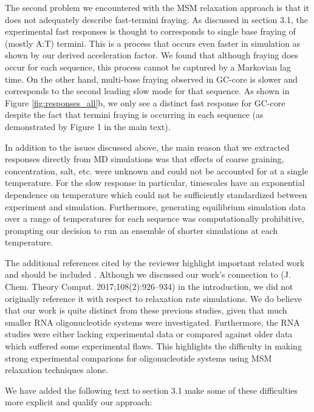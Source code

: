 \documentclass[11pt,a4paper]{letter} %
\begin{document}
The second problem we encountered with the MSM relaxation approach is that it does not adequately describe fast-termini fraying. As discussed in section 3.1, the experimental fast responses is thought to corresponds to single base fraying of (mostly A:T) termini. This is a process that occurs even faster in simulation as shown by our derived acceleration factor. We found that although fraying does occur for each sequence, this process cannot be captured by a Markovian lag time. On the other hand, multi-base fraying observed in GC-core is slower and corresponds to the second leading slow mode for that sequence. As shown in Figure \ref{fig:responses_all}b, we only see a distinct fast response for GC-core despite the fact that termini fraying is occurring in each sequence (as demonstrated by Figure 1 in the main text). 

In addition to the issues discussed above, the main reason that we extracted responses directly from MD simulations was that effects of coarse graining, concentration, salt, etc. were unknown and could not be accounted for at a single temperature. For the slow response in particular,  timescales have an exponential dependence on temperature which could not be sufficiently standardized between experiment and simulation. Furthermore, generating equilibrium simulation data over a range of temperatures for each sequence was computationally prohibitive, prompting our decision to run an ensemble of shorter simulations at each temperature.

The additional references cited by the reviewer highlight important related work and should be included \citep{Noe2011DynamicalExperiments, Pinamonti2017, Remington2019MolecularKinetics}. Although we discussed our work's connection to (J. Chem. Theory Comput. 2017;108(2):926–934)\citep{Pinamonti2017} in the introduction, we did not originally reference it with respect to relaxation rate simulations. We do believe that our work is quite distinct from these previous studies, given that much smaller RNA oligonucleotide systems were investigated. Furthermore, the RNA studies were either lacking experimental data or compared against older data which suffered some experimental flaws. This highlights the difficulty in making strong experimental comparions for oligonucleotide systems using MSM relaxation techniques alone.

We have added the following text to section 3.1 make some of these difficulties more explicit and qualify our approach:
\end{document}
